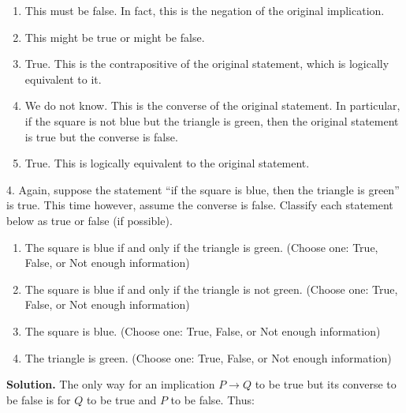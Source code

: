 \documentclass[10pt,]{book}
\theoremstyle{plain}
\theoremstyle{definition}
\theoremstyle{definition}
\numberwithin{equation}{chapter}
\newcommand{\imp}{\rightarrow}
\begin{document}
\begin{exerciselist}
\par
\hypertarget{p-194}{}%
\leavevmode%
\begin{enumerate}[label=(\alph*)]
\item\hypertarget{li-92}{}\hypertarget{p-195}{}%
This must be false.  In fact, this is the negation of the original implication.%
\item\hypertarget{li-93}{}\hypertarget{p-196}{}%
This might be true or might be false.%
\item\hypertarget{li-94}{}\hypertarget{p-197}{}%
True.  This is the contrapositive of the original statement, which is logically equivalent to it.%
\item\hypertarget{li-95}{}\hypertarget{p-198}{}%
We do not know.  This is the converse of the original statement.  In particular, if the square is not blue but the triangle is green, then the original statement is true but the converse is false.%
\item\hypertarget{li-96}{}\hypertarget{p-199}{}%
True.  This is logically equivalent to the original statement.%
\end{enumerate}
%
\par
\item[4.]\hypertarget{exercise-4}{}\noindent%
\hypertarget{p-200}{}%
Again, suppose the statement ``if the square is blue, then the triangle is green'' is true.  This time however, assume the converse is false.  Classify each statement below as true or false (if possible).%
\par
\hypertarget{p-201}{}%
\leavevmode%
\begin{enumerate}[label=(\alph*)]
\item\hypertarget{li-97}{}\hypertarget{p-202}{}%
The square is blue if and only if the triangle is green.  (Choose one: True, False, or Not enough information)%
\item\hypertarget{li-98}{}\hypertarget{p-203}{}%
The square is blue if and only if the triangle is not green. (Choose one: True, False, or Not enough information)%
\item\hypertarget{li-99}{}\hypertarget{p-204}{}%
The square is blue.  (Choose one: True, False, or Not enough information)%
\item\hypertarget{li-100}{}\hypertarget{p-205}{}%
The triangle is green. (Choose one: True, False, or Not enough information)%
\end{enumerate}
%
\par
\medskip\noindent%
\textbf{Solution.}\quad \hypertarget{p-206}{}%
The only way for an implication \(P\imp Q\) to be true but its converse to be false is for \(Q\) to be true and \(P\) to be false.  Thus:%

\end{exerciselist}
\end{document}
